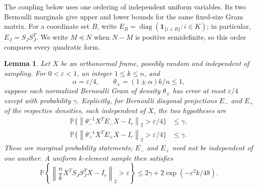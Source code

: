\documentclass[11pt]{article}
\newtheorem{lemma}[theorem]{Lemma}
\theoremstyle{definition}
\theoremstyle{remark}
\theoremstyle{plain}
\newcommand{\Prob}{\mathbb P}
\newcommand{\one}{\mathbf 1}
\newcommand{\norm}[1]{\left\lVert#1\right\rVert_2}
\begin{document}
The coupling below uses one ordering of independent uniform
variables. Its two Bernoulli marginals give upper and lower bounds
for the same fixed-size Gram matrix. For a coordinate set $B$, write
$E_B=\operatorname{diag}(\one_{\{i\in B\}}:i\in K)$; in particular,
$E_J=S_JS_J^T$. We write $M\preceq N$ when $N-M$ is positive
semidefinite, so this order compares every quadratic form.

\begin{lemma}\label{lem:sampling}
Let \(X\) be an orthonormal frame, possibly random and independent
of sampling. For \(0<\varepsilon<1\), an integer \(1\le k\le n\),
and
\[
 \alpha=\varepsilon/4,\qquad
 \theta_\pm=(1\pm\alpha)k/n\le1,
\]
suppose each normalized Bernoulli Gram of density \(\theta_\pm\)
has error at most \(\varepsilon/4\) except with probability
\(\gamma\). Explicitly, for Bernoulli diagonal projections $E_-$
and $E_+$ of the respective densities, each independent of $X$,
the two hypotheses are
\begin{equation}\label{eq:sampling-hypotheses}
\begin{aligned}
 \Prob\{\norm{\theta_-^{-1}X^TE_-X-I_r}>\varepsilon/4\}
          &\le\gamma,\\
 \Prob\{\norm{\theta_+^{-1}X^TE_+X-I_r}>\varepsilon/4\}
          &\le\gamma.
\end{aligned}
\end{equation}
These are marginal probability statements; $E_-$ and $E_+$ need
not be independent of one another. A uniform \(k\)-element sample
then satisfies
\begin{equation}\label{eq:sampling-bound}
 \Prob\left\{\norm{\frac nk X^TS_JS_J^TX-I_r}>\varepsilon\right\}
 \le2\gamma+2\exp(-\varepsilon^2 k/48).
\end{equation}
\end{lemma}
\end{document}

